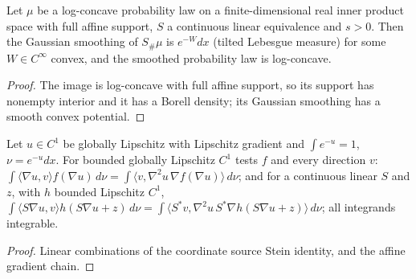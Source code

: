 \begin{lemma}
  \label{lem:gaussian-smoothed-linear-image-potential}
  \leanok
  Let $\mu$ be a log-concave probability law on a finite-dimensional real inner product space with full affine support, $S$ a
  continuous linear equivalence and $s>0$. Then the Gaussian smoothing of $S_\#\mu$ is $e^{-W}dx$ (tilted Lebesgue measure)
  for some $W\in C^\infty$ convex, and the smoothed probability law is log-concave.
\end{lemma}
\begin{proof}
  \leanok
  The image is log-concave with full affine support, so its support has nonempty interior and it has a Borell density;
  its Gaussian smoothing has a smooth convex potential.
\end{proof}

\begin{lemma}
  \label{lem:source-directional-affine-stein}
  \leanok
  Let $u\in C^1$ be globally Lipschitz with Lipschitz gradient and $\int e^{-u}=1$, $\nu=e^{-u}dx$. For bounded globally
  Lipschitz $C^1$ tests $f$ and every direction $v$:
  $\int\langle\nabla u,v\rangle f(\nabla u)\,d\nu=\int\langle v,\nabla^2u\,\nabla f(\nabla u)\rangle\,d\nu$; and for a continuous
  linear $S$ and $z$, with $h$ bounded Lipschitz $C^1$,
  $\int\langle S\nabla u,v\rangle h(S\nabla u+z)\,d\nu=\int\langle S^{*}v,\nabla^2u\,S^{*}\nabla h(S\nabla u+z)\rangle\,d\nu$; all
  integrands integrable.
\end{lemma}
\begin{proof}
  \leanok
  Linear combinations of the coordinate source Stein identity, and the affine gradient chain.
\end{proof}


